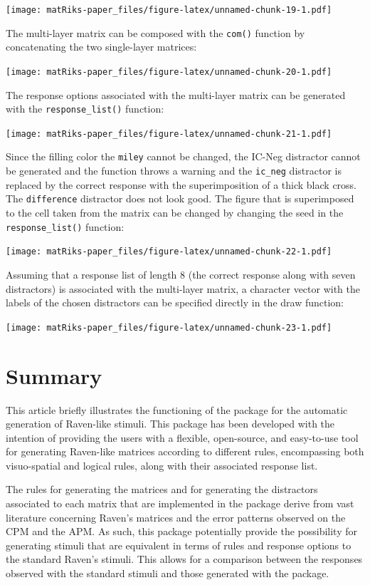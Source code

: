 \texttt{[image: matRiks-paper\_files/figure-latex/unnamed-chunk-19-1.pdf]}

The multi-layer matrix can be composed with the \texttt{com()} function by concatenating the two single-layer matrices:

\texttt{[image: matRiks-paper\_files/figure-latex/unnamed-chunk-20-1.pdf]}

The response options associated with the multi-layer matrix can be generated with the \texttt{response\_list()} function:

\texttt{[image: matRiks-paper\_files/figure-latex/unnamed-chunk-21-1.pdf]}

Since the filling color the \texttt{miley} cannot be changed, the IC-Neg distractor cannot be generated and the function throws a warning and the \texttt{ic\_neg} distractor is replaced by the correct response with the superimposition of a thick black cross.
The \texttt{difference} distractor does not look good.
The figure that is superimposed to the cell taken from the matrix can be changed by changing the seed in the \texttt{response\_list()} function:

\texttt{[image: matRiks-paper\_files/figure-latex/unnamed-chunk-22-1.pdf]}

Assuming that a response list of length 8 (the correct response along with seven distractors) is associated with the multi-layer matrix, a character vector with the labels of the chosen distractors can be specified directly in the draw function:

\texttt{[image: matRiks-paper\_files/figure-latex/unnamed-chunk-23-1.pdf]}

\section{Summary}\label{summary}

This article briefly illustrates the functioning of the  package for the automatic generation of Raven-like stimuli.
This package has been developed with the intention of providing the users with a flexible, open-source, and easy-to-use tool for generating Raven-like matrices according to different rules, encompassing both visuo-spatial and logical rules, along with their associated response list.

The rules for generating the matrices and for generating the distractors associated to each matrix that are implemented in the  package derive from vast literature concerning Raven's matrices and the error patterns observed on the CPM and the APM.
As such, this package potentially provide the possibility for generating stimuli that are equivalent in terms of rules and response options to the standard Raven's stimuli.
This allows for a comparison between the responses observed with the standard stimuli and those generated with the package.

